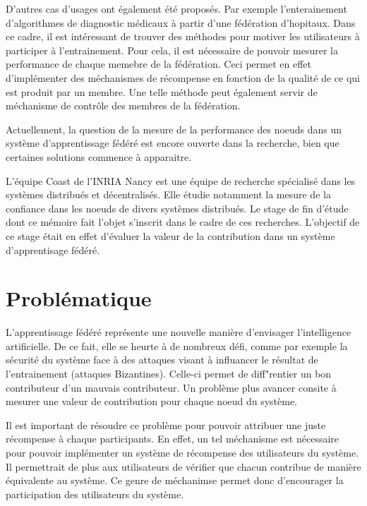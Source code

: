 \documentclass[stage3a]{tnreport} %
\begin{document}
D'autres cas d'usages ont également été proposés. Par exemple l'enterainement d'algorithmes de diagnostic médicaux à partir d'une fédération d'hopitaux. Dans ce cadre, il est intéressant de trouver des méthodes pour motiver les utilisateurs à participer à l'entrainement. Pour cela, il est nécessaire de pouvoir mesurer la performance de chaque memebre de la fédération. Ceci permet en effet d'implémenter des méchanismes de récompense en fonction de la qualité de ce qui est produit par un membre. Une telle méthode peut également servir de méchanisme de contrôle des membres de la fédération. 

Actuellement, la question de la mesure de la performance des noeuds dans un système d'apprentissage fédéré est encore ouverte dans la recherche, bien que certaines solutions commence à apparaitre. 

L'équipe Coast de l'INRIA Nancy est une équipe de recherche spécialisé dans les systèmes distribués et décentralisés. Elle étudie notamment la mesure de la confiance dans les noeuds de divers systèmes distribués. Le stage de fin d'étude dont ce mémoire fait l'objet s'inscrit dans le cadre de ces recherches. L'objectif de ce stage était en effet d'évaluer la valeur de la contribution dans un système d'apprentisage fédéré.


\cleardoublepage


\chapter{Problématique}

L'apprentissage fédéré représente une nouvelle manière d'envisager l'intelligence artificielle. De ce fait, elle se heurte à de nombreux défi, comme par exemple la sécurité du système face à des attaques visant à influancer le résultat de l'entrainement (attaques Bizantines). Celle-ci permet de diff"rentier un bon contributeur d'un mauvais contributeur. Un problème plus avancer consite à mesurer une valeur de contribution pour chaque noeud du système.

Il est important de résoudre ce problème pour pouvoir attribuer une juste récompense à chaque participants. En effet, un tel méchanisme est nécessaire pour pouvoir implémenter un système de récompense des utilisateurs du système. Il permettrait de plus aux utilisateurs de vérifier que chacun contribue de manière équivalente au système. Ce genre de méchanimse permet donc d'encourager la participation des utilisateurs du système. 
\end{document}
